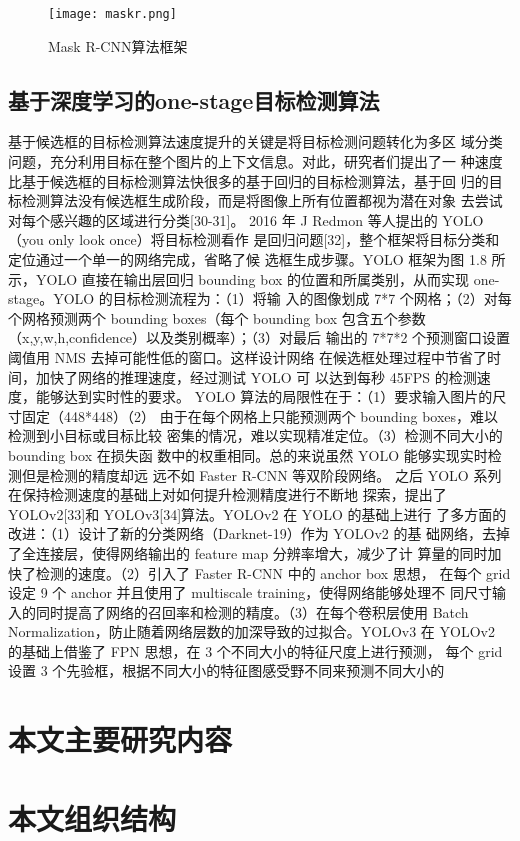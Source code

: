 \begin{figure}[htbp]
    \centering
    \texttt{[image: maskr.png]}
    \caption{Mask R-CNN算法框架}
    \label{maskr}
\end{figure}

\subsection{基于深度学习的one-stage目标检测算法}
基于候选框的目标检测算法速度提升的关键是将目标检测问题转化为多区
域分类问题，充分利用目标在整个图片的上下文信息。对此，研究者们提出了一
种速度比基于候选框的目标检测算法快很多的基于回归的目标检测算法，基于回
归的目标检测算法没有候选框生成阶段，而是将图像上所有位置都视为潜在对象
去尝试对每个感兴趣的区域进行分类[30-31]。
2016 年 J Redmon 等人提出的 YOLO（you only look once）将目标检测看作
是回归问题[32]，整个框架将目标分类和定位通过一个单一的网络完成，省略了候
选框生成步骤。YOLO 框架为图 1.8 所示，YOLO 直接在输出层回归 bounding box
的位置和所属类别，从而实现 one-stage。YOLO 的目标检测流程为：（1）将输
入的图像划成 7*7 个网格；（2）对每个网格预测两个 bounding boxes（每个
bounding box 包含五个参数（x,y,w,h,confidence）以及类别概率）；（3）对最后
输出的 7*7*2 个预测窗口设置阈值用 NMS 去掉可能性低的窗口。这样设计网络
在候选框处理过程中节省了时间，加快了网络的推理速度，经过测试 YOLO 可
以达到每秒 45FPS 的检测速度，能够达到实时性的要求。
YOLO 算法的局限性在于：（1）要求输入图片的尺寸固定（448*448）（2）
由于在每个网格上只能预测两个 bounding boxes，难以检测到小目标或目标比较
密集的情况，难以实现精准定位。（3）检测不同大小的 bounding box 在损失函
数中的权重相同。总的来说虽然 YOLO 能够实现实时检测但是检测的精度却远
远不如 Faster R-CNN 等双阶段网络。
之后 YOLO 系列在保持检测速度的基础上对如何提升检测精度进行不断地
探索，提出了 YOLOv2[33]和 YOLOv3[34]算法。YOLOv2 在 YOLO 的基础上进行
了多方面的改进：（1）设计了新的分类网络（Darknet-19）作为 YOLOv2 的基
础网络，去掉了全连接层，使得网络输出的 feature map 分辨率增大，减少了计
算量的同时加快了检测的速度。（2）引入了 Faster R-CNN 中的 anchor box 思想，
在每个 grid 设定 9 个 anchor 并且使用了 multiscale training，使得网络能够处理不
同尺寸输入的同时提高了网络的召回率和检测的精度。（3）在每个卷积层使用
Batch Normalization，防止随着网络层数的加深导致的过拟合。YOLOv3 在
YOLOv2 的基础上借鉴了 FPN 思想，在 3 个不同大小的特征尺度上进行预测，
每个 grid 设置 3 个先验框，根据不同大小的特征图感受野不同来预测不同大小的

\section{本文主要研究内容}

\section{本文组织结构}